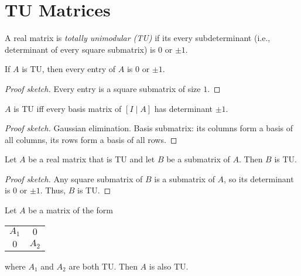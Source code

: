 \section{TU Matrices}

\begin{definition}[TU matrix]
  \label{def:code_tu_matrix}
  A real matrix is \emph{totally unimodular (TU)} if its every subdeterminant (i.e., determinant of every square submatrix) is $0$ or $\pm 1$.
\end{definition}

\begin{lemma}
  \label{lem:code_tu_entries}
  If $A$ is TU, then every entry of $A$ is $0$ or $\pm 1$.
\end{lemma}

\begin{proof}[Proof sketch]
  Every entry is a square submatrix of size $1$.
\end{proof}

\begin{lemma}
  \label{lem:code_tu_adjoin_id}
  $A$ is TU iff every basis matrix of $\left[ I \mid A \right]$ has determinant $\pm 1$.
\end{lemma}

\begin{proof}[Proof sketch]
  Gaussian elimination. Basis submatrix: its columns form a basis of all columns, its rows form a basis of all rows.
\end{proof}

\begin{lemma}
  \label{lem:code_submatrix_of_tu}
  Let $A$ be a real matrix that is TU and let $B$ be a submatrix of $A$. Then $B$ is TU.
\end{lemma}

\begin{proof}[Proof sketch]
  Any square submatrix of $B$ is a submatrix of $A$, so its determinant is $0$ or $\pm 1$. Thus, $B$ is TU.
\end{proof}

\begin{lemma}
  \label{lem:code_diagonal_with_tu_blocks}
  Let $A$ be a matrix of the form
  \begin{tabular}{cc}
    \cline{1-2}
    \multicolumn{1}{|c|}{$A_{1}$} & \multicolumn{1}{c|}{    $0$} \\ \cline{1-2}
    \multicolumn{1}{|c|}{    $0$} & \multicolumn{1}{c|}{$A_{2}$} \\ \cline{1-2}
  \end{tabular}
  where $A_{1}$ and $A_{2}$ are both TU. Then $A$ is also TU.
\end{lemma}

